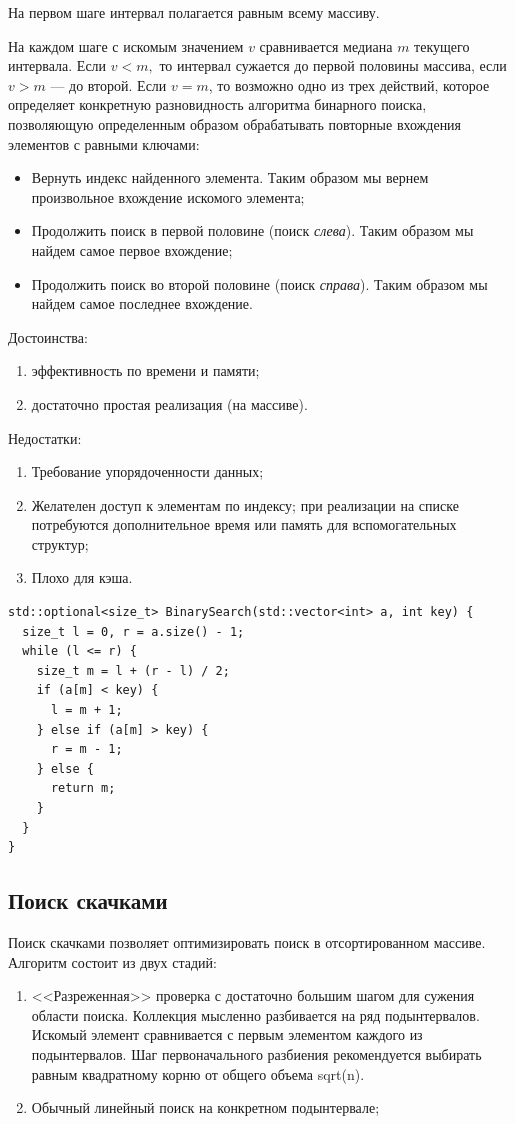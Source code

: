 На первом шаге интервал полагается равным всему массиву.

На каждом шаге с искомым значением $v$ сравнивается медиана $m$ текущего интервала.
Если $v < m,$ то интервал сужается до первой половины массива, если $v > m$ --- до второй.
Если $v = m$, то возможно одно из трех действий, которое определяет конкретную разновидность
алгоритма бинарного поиска, позволяющую определенным образом обрабатывать повторные
вхождения элементов с равными ключами:
\begin{itemize}
  \item Вернуть индекс найденного элемента. Таким образом мы вернем произвольное вхождение искомого элемента;
  \item Продолжить поиск в первой половине (поиск \textit{слева}). Таким образом мы найдем самое первое вхождение;
  \item Продолжить поиск во второй половине (поиск \textit{справа}). Таким образом мы найдем самое последнее вхождение.
\end{itemize}

Достоинства:
\begin{enumerate}
  \item эффективность по времени и памяти;
  \item достаточно простая реализация (на массиве).
\end{enumerate}
Недостатки:
\begin{enumerate}
  \item Требование упорядоченности данных;
  \item Желателен доступ к элементам по индексу; при реализации на
  списке потребуются дополнительное время или память для
  вспомогательных структур;
  \item Плохо для кэша.
\end{enumerate}

\begin{verbatim}
std::optional<size_t> BinarySearch(std::vector<int> a, int key) {
  size_t l = 0, r = a.size() - 1;
  while (l <= r) {
    size_t m = l + (r - l) / 2;
    if (a[m] < key) {
      l = m + 1;
    } else if (a[m] > key) {
      r = m - 1;
    } else {
      return m;
    }
  }
}
\end{verbatim}

\subsection{Поиск скачками}
Поиск скачками позволяет оптимизировать поиск в отсортированном массиве.
Алгоритм состоит из двух стадий:
\begin{enumerate}
  \item <<Разреженная>> проверка с достаточно большим шагом для сужения области
    поиска. Коллекция мысленно разбивается на ряд подынтервалов. Искомый
    элемент сравнивается с первым элементом каждого из подынтервалов.
    Шаг первоначального разбиения рекомендуется выбирать равным
    квадратному корню от общего объема sqrt(n).
  \item Обычный линейный поиск на конкретном подынтервале;
\end{enumerate}

